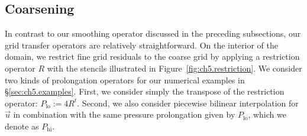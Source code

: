 \subsection{Coarsening}

In contrast to our smoothing operator discussed in the preceding subsections, our grid transfer operators are relatively straightforward. On the interior of the domain, we restrict fine grid residuals to the coarse grid by applying a restriction operator $R$ with the stencils illustrated in Figure~\ref{fig:ch5.restriction}. We consider two kinds of prolongation operators for our numerical examples in \S\ref{sec:ch5.examples}. First, we consider simply the transpose of the restriction operator: $P_{\text{lo}} := 4 R^t$. Second, we also consider piecewise bilinear interpolation for $\vec{u}$ in combination with the same pressure prolongation given by $P_{\text{lo}}$, which we denote as $P_{\text{hi}}$.


